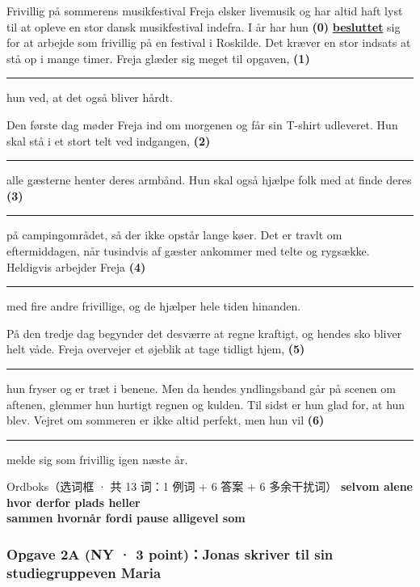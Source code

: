 \begin{emailbox}{Frivillig på sommerens musikfestival}
Freja elsker livemusik og har altid haft lyst til at opleve en stor dansk musikfestival indefra. I år har hun \textbf{(0)} \underline{\textbf{besluttet}} sig for at arbejde som frivillig på en festival i Roskilde. Det kræver en stor indsats at stå op i mange timer. Freja glæder sig meget til opgaven, \textbf{(1)}\ \rule{1.9cm}{0.4pt} hun ved, at det også bliver hårdt.

\vspace{0.35em}
Den første dag møder Freja ind om morgenen og får sin T-shirt udleveret. Hun skal stå i et stort telt ved indgangen, \textbf{(2)}\ \rule{1.9cm}{0.4pt} alle gæsterne henter deres armbånd. Hun skal også hjælpe folk med at finde deres \textbf{(3)}\ \rule{1.9cm}{0.4pt} på campingområdet, så der ikke opstår lange køer. Det er travlt om eftermiddagen, når tusindvis af gæster ankommer med telte og rygsække. Heldigvis arbejder Freja \textbf{(4)}\ \rule{1.9cm}{0.4pt} med fire andre frivillige, og de hjælper hele tiden hinanden.

\vspace{0.35em}
På den tredje dag begynder det desværre at regne kraftigt, og hendes sko bliver helt våde. Freja overvejer et øjeblik at tage tidligt hjem, \textbf{(5)}\ \rule{1.9cm}{0.4pt} hun fryser og er træt i benene. Men da hendes yndlingsband går på scenen om aftenen, glemmer hun hurtigt regnen og kulden. Til sidst er hun glad for, at hun blev. Vejret om sommeren er ikke altid perfekt, men hun vil \textbf{(6)}\ \rule{1.9cm}{0.4pt} melde sig som frivillig igen næste år.
\end{emailbox}

\begin{grammatikbox}{Ordboks（选词框 · 共 13 词：1 例词 + 6 答案 + 6 多余干扰词）}
\centering
\large\bfseries\color{NCDNavy}
 \qquad
selvom \qquad alene \qquad hvor \qquad derfor \qquad plads \qquad heller\\[3pt]
sammen \qquad hvornår \qquad fordi \qquad pause \qquad alligevel \qquad som
\end{grammatikbox}

\subsubsection*{Opgave 2A (NY · 3 point)：Jonas skriver til sin studiegruppeven Maria}

